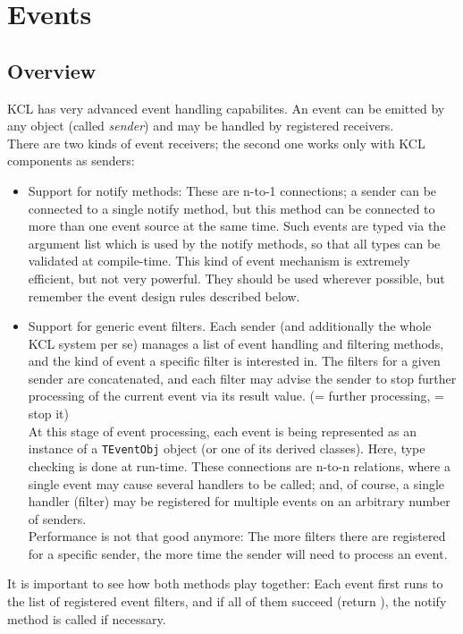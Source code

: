 
\chapter{Events}


\section{Overview}
KCL has very advanced event handling capabilites. An event can be emitted by
any object (called \textit{sender}) and may be handled by registered receivers.
\\ There are two kinds of event receivers; the second one works only with KCL
components as senders:
\begin{itemize}
\item Support for notify methods: These are n-to-1 connections; a sender can
      be connected to a single notify method, but this method can be connected
      to more than one event source at the same time.
      Such events are typed via the argument list which is used by
      the notify methods, so that all types can be validated at compile-time.
      This kind of event mechanism is extremely efficient, but not very
      powerful. They should be used wherever possible, but remember the event
      design rules described below.
\item Support for generic event filters. Each sender (and additionally
      the whole KCL system per se) manages a list of event handling and
      filtering methods, and the kind of event a specific filter is interested
      in. The filters for a given sender are concatenated, and each filter may
      advise the sender to stop further processing of the current event via its
      result value. (\true = further processing, \false = stop it)\\
      At this stage of event processing, each event is being represented
      as an instance of a \texttt{TEventObj} object (or one of its derived
      classes). Here, type checking is done at run-time. These connections are
      n-to-n relations, where a single event may cause several handlers to
      be called; and, of course, a single handler (filter) may be registered
      for multiple events on an arbitrary number of senders.\\
      Performance is not that good anymore: The more filters there are
      registered for a specific sender, the more time the sender will need to
      process an event.
\end{itemize}
It is important to see how both methods play together: Each event first runs to
the list of registered event filters, and if all of them succeed (return \true),
the notify method is called if necessary.\\
